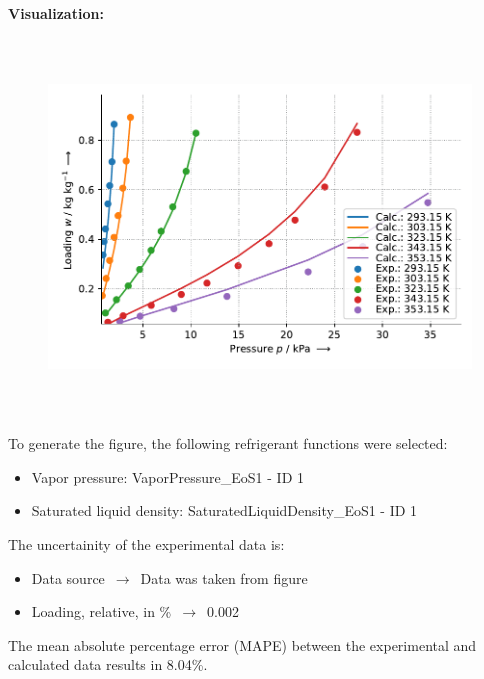 \textbf{Visualization:}
%
\begin{figure}[!htp]
{\noindent\includegraphics[height=10cm, keepaspectratio]{figs/ads/ads_Water_polymer_PS-II_DubininAstakhov_1.pdf}}
\end{figure}
%

To generate the figure, the following refrigerant functions were selected:
\begin{itemize}
\item Vapor pressure: VaporPressure\_EoS1 - ID 1
\item Saturated liquid density: SaturatedLiquidDensity\_EoS1 - ID 1
\end{itemize}

The uncertainity of the experimental data is:
\begin{itemize}
\item Data source $\,\to\,$ Data was taken from figure
\item Loading, relative, in \% $\,\to\,$ 0.002
\end{itemize}

The mean absolute percentage error (MAPE) between the experimental and calculated data results in 8.04\%.
\FloatBarrier
\newpage
